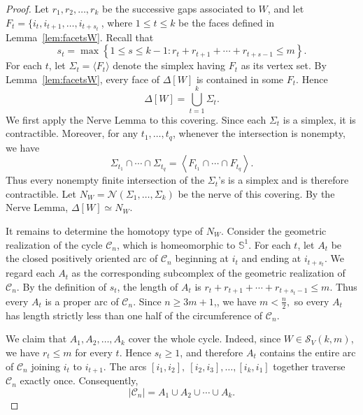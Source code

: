 \documentclass[12pt,reqno]{amsart}
\theoremstyle{definition}
\numberwithin{equation}{section}
\def\C{\mathcal{C}}
\begin{document}
\begin{proof}
	Let $r_1,r_2,\ldots,r_k$ be the successive gaps associated to $W$,
	and let \( F_t=\{i_t,i_{t+1},\ldots,i_{t+s_t}\ \), where \( 1\leq t\leq k \)
	be the faces defined in Lemma~\ref{lem:facetsW}. Recall that
	\[
	s_t=
	\max\left\{
	1\leq s\leq k-1:
	r_t+r_{t+1}+\cdots+r_{t+s-1}\leq m
	\right\}.
	\]
	For each $t$, let \( \Sigma_t=\langle F_t\rangle \)
	denote the simplex having $F_t$ as its vertex set. By
	Lemma~\ref{lem:facetsW}, every face of $\Delta[W]$ is contained in
	some $F_t$. Hence
	\[
	\Delta[W]=\bigcup_{t=1}^{k}\Sigma_t.
	\]
	We first apply the Nerve Lemma to this covering. Since each
	$\Sigma_t$ is a simplex, it is contractible. Moreover, for any
	$t_1,\ldots,t_q$, whenever the intersection is nonempty, we have
	\[
	\Sigma_{t_1}\cap\cdots\cap\Sigma_{t_q}
	=
	\left\langle
	F_{t_1}\cap\cdots\cap F_{t_q}
	\right\rangle.
	\]
	Thus every nonempty finite intersection of the $\Sigma_t$'s is a
	simplex and is therefore contractible. Let \( 	N_W=\mathcal N(\Sigma_1,\ldots,\Sigma_k) \)
	be the nerve of this covering. By the Nerve Lemma, \( \Delta[W]\simeq N_W. \)
	
	It remains to determine the homotopy type of $N_W$. Consider the
	geometric realization of the cycle $\C_n$, which is homeomorphic to
	$\mathbb S^1$. For each $t$, let $A_t$ be the closed positively
	oriented arc of $\C_n$ beginning at $i_t$ and ending at
	$i_{t+s_t}$. We regard each $A_t$ as the corresponding subcomplex
	of the geometric realization of $\C_n$. By the definition of $s_t$,
	the length of $A_t$ is \( 	r_t+r_{t+1}+\cdots+r_{t+s_t-1}\leq m. \)
	Thus every $A_t$ is a proper arc of $\C_n$. Since $n\geq3m+1$,, we
	have \( m<\frac{n}{2}, \)
	so every $A_t$ has length strictly less than one half of the
	circumference of $\C_n$.
	
	We claim that $A_1,A_2,\ldots,A_k$ cover the whole cycle. Indeed,
	since $W\in\mathcal S_V(k,m)$, we have $r_t\leq m$ for every $t$.
	Hence $s_t\geq1$, and therefore $A_t$ contains the entire arc of
	$\C_n$ joining $i_t$ to $i_{t+1}$. The arcs \( [i_1,i_2],\ [i_2,i_3],\ldots,[i_k,i_1] \)
	together traverse $\C_n$ exactly once. Consequently,
	\[
	|\C_n|=A_1\cup A_2\cup\cdots\cup A_k.
	\]
	

\end{proof}
\end{document}

